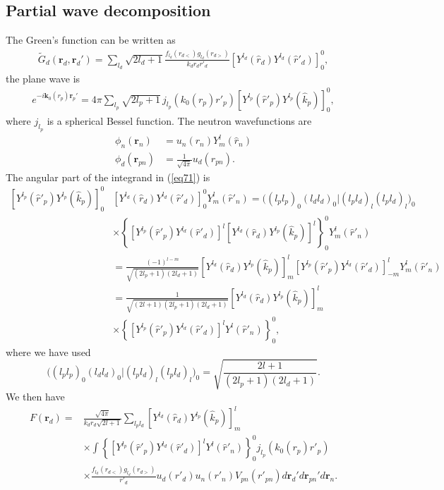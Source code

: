 \documentclass[a4paper,11pt]{article}
\begin{document}
\subsection{Partial wave decomposition}

The Green's function can be written as
\begin{align}\label{eq44}
\widetilde G_d(\mathbf r_d,\mathbf r_d')=\sum_{l_d}\sqrt{2l_d+1}\frac{f_{l_d}(r_{d<})g_{l_d}(r_{d>})}{k_dr_dr'_d}\left[Y^{l_d}(\hat r_d) Y^{l_d}(\hat r'_d)\right]^0_0,
\end{align}
the plane wave is
\begin{align}\label{eq45}
e^{-i\mathbf k_0(r_p)\mathbf r_p'}=4\pi\sum_{l_p}\sqrt{2l_p+1}\,j_{l_p}(k_0(r_p) r'_p)\left[Y^{l_p}(\hat r'_p) Y^{l_p}(\hat k_p)\right]^0_0,
\end{align}
where $j_{l_p}$ is a spherical Bessel function.  The neutron wavefunctions are
\begin{align}\label{eq38}
\nonumber \phi_n(\mathbf{r}_n)&=u_n(r_n)Y^{l}_{m}(\hat r_n)\\
\phi_d(\mathbf{r}_{pn})&=\frac{1}{\sqrt{4\pi}}u_d(r_{pn}).
\end{align}
The angular part of the integrand in (\ref{eq71}) is
\begin{align}\label{eq46}
\nonumber\left[Y^{l_p}(\hat r'_p) Y^{l_p}(\hat k_p)\right]^0_0&\left[Y^{l_d}(\hat r_d) Y^{l_d}(\hat r'_d)\right]^0_0Y_m^l(\hat r'_n)=\bigl((l_p l_p)_0(l_d l_d)_0|(l_p l_d)_l(l_p l_d)_{l}\bigr)_0\\
\nonumber&\times \left\{\left[Y^{l_p}(\hat r'_p) Y^{l_d}(\hat r'_d)\right]^l\left[Y^{l_d}(\hat r_d) Y^{l_p}(\hat k_p)\right]^l\right\}^0_0Y_m^l(\hat r'_n)\\
\nonumber&=\frac{(-1)^{l-m}}{\sqrt{(2l_p+1)(2l_d+1)}}\left[Y^{l_d}(\hat r_d) Y^{l_p}(\hat k_p)\right]^l_m\left[Y^{l_p}(\hat r'_p) Y^{l_d}(\hat r'_d)\right]^l_{-m}Y_m^l(\hat r'_n)\\
\nonumber &=\frac{1}{\sqrt{(2l+1)(2l_p+1)(2l_d+1)}}\left[Y^{l_d}(\hat r_d) Y^{l_p}(\hat k_p)\right]^l_m\\
&\times\left\{\left[Y^{l_p}(\hat r'_p) Y^{l_d}(\hat r'_d)\right]^lY^l(\hat r'_n)\right\}^0_0,
\end{align}
where we have used
\begin{equation}\label{eq61}
\bigl((l_p l_p)_0(l_d l_d)_0|(l_p l_d)_l(l_p l_d)_{l}\bigr)_0=\sqrt{\frac{2l+1}{(2l_p+1)(2l_d+1)}}.
\end{equation}
We then have 
 \begin{align}\label{eq47}
\nonumber F(\mathbf r_d)=&\frac{\sqrt{4\pi}}{k_dr_d\sqrt{2l+1}}\sum_{l_pl_d} \left[Y^{l_d}(\hat r_d) Y^{l_p}(\hat k_p)\right]^l_m\\
\nonumber&\times\int \left\{\left[Y^{l_p}(\hat r'_p) Y^{l_d}(\hat r'_d)\right]^lY^l(\hat r'_n)\right\}^0_0j_{l_p}(k_0(r_p) r'_p)\\
&\times \frac{f_{l_d}(r_{d<})g_{l_d}(r_{d>})}{r'_d}  u_d(r'_d)u_n(r'_n)V_{pn}(r'_{pn}) d\mathbf r_d' d\mathbf r_{pn}'d\mathbf r_n.
 \end{align}
\end{document}

